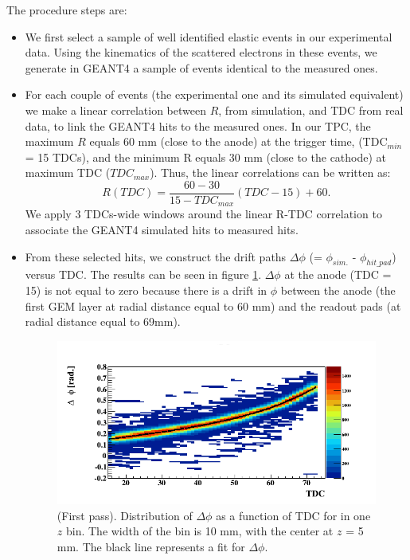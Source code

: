 The procedure steps are:\\
\begin{itemize}
\item We first select a sample of well identified elastic events in our experimental data. Using the
   kinematics of the scattered electrons in these events, we generate in GEANT4
   a sample of events identical to the measured ones. 
\item  For each couple of events (the experimental one and its simulated equivalent)
   we make a linear correlation between $R$, from simulation, and TDC from 
   real data, to link the GEANT4 hits to the measured ones. In our TPC, the 
   maximum $R$ equals 60 mm (close to the anode) at the trigger time, 
   (TDC$_{min}$ = 15 TDCs), and the minimum R equals 30 mm (close to the 
   cathode) at maximum TDC ($TDC_{max}$). Thus, the linear correlations can be 
   written as:
\begin{equation}
   R(TDC) = \frac{60-30}{15-TDC_{max}} (TDC-15) + 60.
\label{equ:R_TDC}
\end{equation}
We apply 3 TDCs-wide windows around the linear R-TDC correlation to associate the 
GEANT4 simulated hits to measured hits.

\item From these selected hits, we construct the drift paths $\Delta \phi$ (= 
   $\phi_{sim.}$ - $\phi_{hit\_pad}$) versus TDC. The results can be seen in 
   figure \ref{fig:1st_pass_delta_phi}. $\Delta \phi$ at the anode (TDC = 15) 
   is not equal to zero because there is a drift in $\phi$ between the anode 
   (the first GEM layer at radial distance equal to 60 mm) and the readout pads 
   (at radial distance equal to 69mm).

\begin{figure}[tp]
\centering
\includegraphics[scale=0.45]{fig_rtpc/TdcPhi_p1_10.png}
\caption{(First pass). Distribution of $\Delta \phi$ as a function of TDC for 
   in one $z$ bin. The width of the bin is 10 mm, 
with the center at $z$ = 5 mm. The black line represents a fit for 
$\Delta\phi$.  }
\label{fig:1st_pass_delta_phi}
\end{figure} 


\end{itemize}
